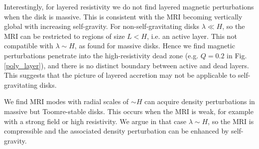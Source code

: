 { 
%
  
}


Interestingly, for layered resistivity we do not find layered
magnetic perturbations when the disk is massive. This is 
consistent with the MRI becoming vertically global with increasing self-gravity.    
For non-self-gravitating disks $\lambda\ll H$, so the MRI can be
restricted to regions of size $L<H$, i.e. an active layer. This not
compatible with $\lambda \sim H$, as found for massive disks. Hence we
find magnetic perturbations penetrate into the high-resistivity dead
zone (e.g. $Q=0.2$ in Fig. \ref{poly_layer}), and there is no distinct
boundary between active and dead layers. This suggests that the
picture of layered accretion  \citep[e.g.][]{fleming03} may not be applicable 
to self-gravitating disks.  

We find MRI modes with radial scales of $\sim H$ can acquire  
density perturbations in massive but Toomre-stable disks. 
This occurs when the MRI is weak, for example with a strong field or
high resistivity. We argue in that case $\lambda\sim H$, so the MRI is
compressible and the associated density
perturbation can be enhanced by self-gravity.


